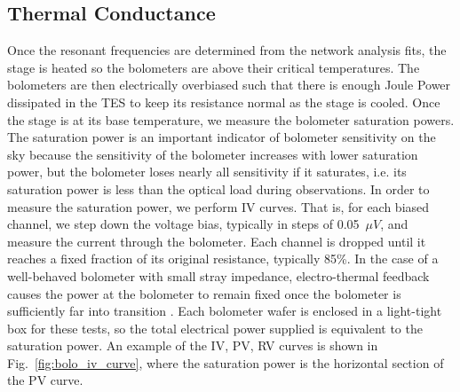 \subsection{Thermal Conductance}
\label{sec:thermal_conductance}

Once the resonant frequencies are determined from the network analysis fits, the stage is heated so the bolometers are above their critical temperatures. 
The bolometers are then electrically overbiased such that there is enough Joule Power dissipated in the \ac{TES} to keep its resistance normal as the stage is cooled. 
Once the stage is at its base temperature, we measure the bolometer saturation powers. 
The saturation power is an important indicator of bolometer sensitivity on the sky because the sensitivity of the bolometer increases with lower saturation power, but the bolometer loses nearly all sensitivity if it saturates, i.e. its saturation power is less than the optical load during observations. 
In order to measure the saturation power, we perform IV curves. 
That is, for each biased channel, we step down the voltage bias, typically in steps of 0.05~$\mu V$, and measure the current through the bolometer. 
Each channel is dropped until it reaches a fixed fraction of its original resistance, typically 85\%.
In the case of a well-behaved bolometer with small stray impedance, electro-thermal feedback causes the power at the bolometer to remain fixed once the bolometer is sufficiently far into transition \cite{lanting_thesis}.
Each bolometer wafer is enclosed in a light-tight box for these tests, so the total electrical power supplied is equivalent to the saturation power. 
An example of the IV, PV, RV curves is shown in Fig.~\ref{fig:bolo_iv_curve}, where the saturation power is the horizontal section of the PV curve.


